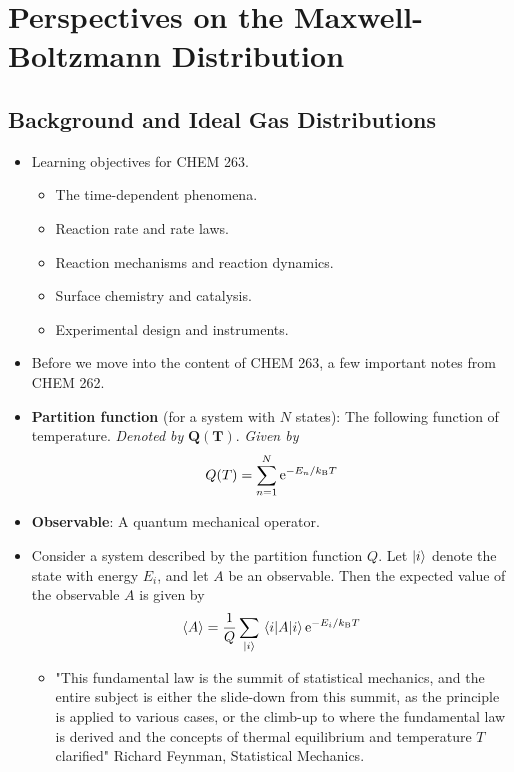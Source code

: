 \documentclass[../notes.tex]{subfiles}
\begin{document}
\chapter{Perspectives on the Maxwell-Boltzmann Distribution}
\section{Background and Ideal Gas Distributions}
\begin{itemize}
    \item {}Learning objectives for CHEM 263.
    \begin{itemize}
        \item The time-dependent phenomena.
        \item Reaction rate and rate laws.
        \item Reaction mechanisms and reaction dynamics.
        \item Surface chemistry and catalysis.
        \item Experimental design and instruments.
    \end{itemize}
    \item Before we move into the content of CHEM 263, a few important notes from CHEM 262.
    \item \textbf{Partition function} (for a system with $N$ states): The following function of temperature. \emph{Denoted by} $\bm{Q(T)}$. \emph{Given by}
    \begin{equation*}
        Q(T) = \sum_{n=1}^N\e[-E_n/\kB T]
    \end{equation*}
    \item \textbf{Observable}: A quantum mechanical operator.
    \item Consider a system described by the partition function $Q$. Let $\ket{i}$ denote the state with energy $E_i$, and let $A$ be an observable. Then the expected value of the observable $A$ is given by
    \begin{equation*}
        \prb{A} = \frac{1}{Q}\sum_{\ket{i}}\ev{A}{i}\e[-E_i/\kB T]
    \end{equation*}
    \begin{itemize}
        \item "This fundamental law is the summit of statistical mechanics, and the entire subject is either the slide-down from this summit, as the principle is applied to various cases, or the climb-up to where the fundamental law is derived and the concepts of thermal equilibrium and temperature $T$ clarified" Richard Feynman, Statistical Mechanics.

\end{itemize}
\end{itemize}
\end{document}
